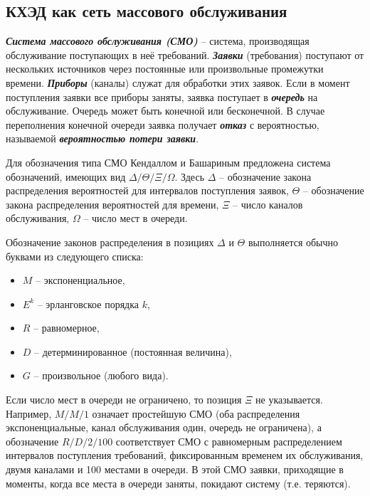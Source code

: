 \subsection{КХЭД как сеть массового обслуживания} \label{net}

\textbf{\textit{Система массового обслуживания (СМО)}} -- система, производящая обслуживание поступающих в неё требований. \textbf{\textit{Заявки}} (требования) поступают от нескольких источников через постоянные или произвольные промежутки времени. \textbf{\textit{Приборы}} (каналы) служат для обработки этих заявок. Если в момент поступления заявки все приборы заняты, заявка поступает в \textbf{\textit{очередь}} на обслуживание. Очередь может быть конечной или бесконечной. В случае переполнения конечной очереди заявка получает \textbf{\textit{отказ}} с вероятностью, называемой \textbf{\textit{вероятностью потери заявки}}.

\vspace{\baselineskip}
Для обозначения типа СМО Кендаллом и Башариным предложена система обозначений, имеющих вид $\Delta / \Theta / \Xi / \Omega$. \cite{bib4,bib5,bib6} Здесь $\Delta$ -- обозначение закона распределения вероятностей для интервалов поступления заявок, $\Theta$ – обозначение закона распределения вероятностей для времени, $\Xi$ – число каналов обслуживания, $\Omega$ – число мест в очереди.

\vspace{\baselineskip}
Обозначение законов распределения в позициях $\Delta$ и $\Theta$ выполняется обычно буквами из следующего списка:

\begin{itemize}
  \item $M$ -- экспоненциальное,
  \item $E^k$ -- эрланговское порядка $k$,
  \item $R$ -- равномерное,
  \item $D$ -- детерминированное (постоянная величина),
  \item $G$ -- произвольное (любого вида).
\end{itemize}

Если число мест в очереди не ограничено, то позиция $\Xi$ не указывается.
Например, $M/M/1$ означает простейшую СМО (оба распределения экспоненциальные, канал обслуживания один, очередь не ограничена), а обозначение $R/D/2/100$ соответствует СМО с равномерным распределением интервалов поступления требований, фиксированным временем их обслуживания, двумя каналами и 100 местами в очереди. В этой СМО заявки, приходящие в моменты, когда все места в очереди заняты, покидают систему (т.е. теряются).

